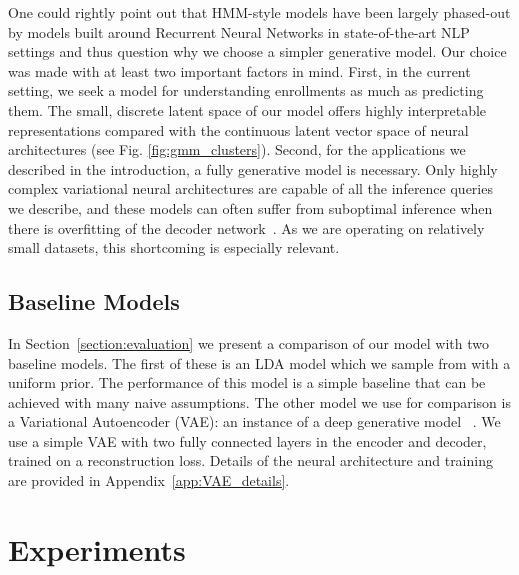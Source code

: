 \documentclass{edm_template}
\begin{document}
One could rightly point out that HMM-style models have been largely phased-out by models built around Recurrent Neural Networks in state-of-the-art NLP settings and thus question why we choose a simpler generative model. Our choice was made with at least two important factors in mind. First, in the current setting, we seek a model for understanding enrollments as much as predicting them. The small, discrete latent space of our model offers highly interpretable representations compared with the continuous latent vector space of neural architectures (see Fig. \ref{fig:gmm_clusters}). Second, for the applications we described in the introduction, a fully generative model is necessary. Only highly complex variational neural architectures are capable of all the inference queries we describe, and these models can often suffer from suboptimal inference when there is overfitting of the decoder network~\cite{zhao2017infovae}. As we are operating on relatively small datasets, this shortcoming is especially relevant.

\subsection{Baseline Models}
\label{section:baselines}

In Section~\ref{section:evaluation} we present a comparison of our model with two baseline models. The first of these is an LDA model which we sample from with a uniform prior. The performance of this model is a simple baseline that can be achieved with many naive assumptions. The other model we use for comparison is a Variational Autoencoder (VAE): an instance of a deep generative model ~\cite{kingma2013auto}. We use a simple VAE with two fully connected layers in the encoder and decoder, trained on a reconstruction loss. Details of the neural architecture and training are provided in Appendix~\ref{app:VAE_details}.  

\section{Experiments}
\end{document}
